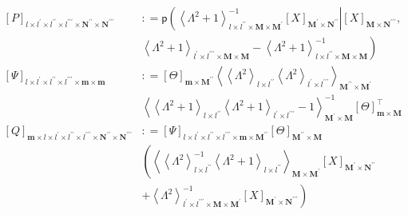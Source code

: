 \documentclass[preprint,12pt]{elsarticle}
\newcommand*{\M}[1]{\ensuremath{#1}\xspace}
\newcommand*{\x}{\times}
\newcommand*{\mi}[1]{\mathbf{#1}}
\newcommand*{\te}[2][]{\left\lbrack{#2}\right\rbrack_{#1}}
\newcommand*{\diag}[2][]{\left\langle{#2}\right\rangle_{#1}}
\newcommand*{\deq}{\M{\mathrel{\mathop:}=}}
\begin{document}
    \begin{equation*}
        \begin{aligned}
            \te[l\x l^{\prime}\x l^{\prime\prime}\x l^{\prime\prime\prime}\x \mi{N^{\prime\prime}}\x \mi{N^{\prime\prime\prime}}]{P} &\deq
            \mathsf{p} \left(
            {\diag[l\x l^{\prime\prime}\x \mi{M}\x \mi{M^{\prime}}]{\Lambda^{2} + 1}^{-1} \te[\mi{M^{\prime}}\x\mi{N^{\prime\prime}}]{X}} \right\vert {\te[\mi{M}\x\mi{N^{\prime\prime\prime}}]{X}}, \\
            &\left. {\diag[l^{\prime}\x l^{\prime\prime\prime}\x\mi{M}\x\mi{M}]{\Lambda^{2} + 1} - \diag[l\x l^{\prime\prime}\x\mi{M}\x\mi{M}]{\Lambda^{2} + 1}^{-1}} \right) \\
            \te[l\x l^{\prime}\x l^{\prime\prime}\x l^{\prime\prime\prime}\x\mi{m}\x\mi{m}]{\Psi} &\deq \te[\mi{m}\x\mi{M^{\prime\prime}}]{\Theta} \diag[\mi{M^{\prime\prime}}\x\mi{M^{\prime}}]{\diag[l\x l^{\prime\prime}]{\Lambda^{2}} \diag[l^{\prime}\x l^{\prime\prime\prime}]{\Lambda^{2}}}\\ 
            &\diag[\mi{M^{\prime}}\x\mi{M}]{\diag[l\x l^{\prime\prime}]{\Lambda^{2} + 1} \diag[l^{\prime}\x l^{\prime\prime\prime}]{\Lambda^{2} + 1} - 1}^{-1} \te[\mi{m}\x\mi{M}]{\Theta}^{\intercal}\\
            \te[\mi{m}\x l\x l^{\prime}\x l^{\prime\prime}\x l^{\prime\prime\prime}\x \mi{N^{\prime\prime}}\x \mi{N^{\prime\prime\prime}}]{Q} &\deq \te[l\x l^{\prime}\x l^{\prime\prime}\x l^{\prime\prime\prime}\x\mi{m}\x\mi{M^{\prime\prime}}]{\Psi} \te[\mi{M^{\prime\prime}}\x\mi{M}]{\Theta} \\
            &\left(\diag[\mi{M}\x\mi{M^{\prime}}]{\diag[l\x l^{\prime\prime}]{\Lambda^{2}}^{-1} {\diag[l\x l^{\prime\prime}]{\Lambda^{2} + 1}}} \te[\mi{M^{\prime}}\x\mi{N^{\prime\prime}}]{X} \right. \\
            &\left. + {\diag[l^{\prime}\x l^{\prime\prime\prime}\x \mi{M}\x \mi{M^{\prime}}]{\Lambda^{2}}^{-1} \te[\mi{M^{\prime}}\x\mi{N^{\prime\prime\prime}}]{X}} \right)
        \end{aligned}
    \end{equation*}



 

\end{document}
